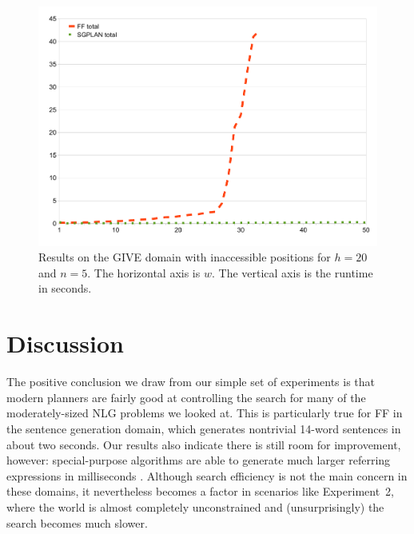 \documentclass[letterpaper]{article}
\begin{document}
\begin{figure}
  \centering
  \includegraphics[width=0.85\columnwidth]{graph-exp4}
  \caption{Results on the GIVE domain with inaccessible
    positions for $h=20$ and $n=5$. The horizontal axis is $w$.
    The vertical axis is the runtime in seconds.}
  \label{fig:give-runtime-nosoln}
\end{figure}

\section{Discussion}
\label{sec:discussion}

The positive conclusion we draw from our simple set of experiments is that
modern planners are fairly good at controlling the search for many of the
moderately-sized NLG problems we looked at. This is particularly true for
FF in the sentence generation domain, which generates nontrivial 14-word
sentences in about two seconds. Our results also indicate there is still
room for improvement, however: special-purpose algorithms are able to
generate much larger referring expressions in milliseconds
\citep{AreKolStr08}. Although search efficiency is not the main concern in
these domains, it nevertheless becomes a factor in scenarios like
Experiment~2, where the world is almost completely unconstrained and
(unsurprisingly) the search becomes much slower.
\end{document}
